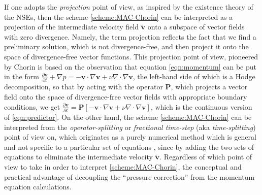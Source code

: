 \documentclass{article}
\begin{document}
If one adopts the \textit{projection} point of view, as inspired by the existence theory of the NSEs, then the scheme \eqref{scheme:MAC-Chorin} can be interpreted as a projection of the intermediate velocity field $\widetilde{\boldsymbol{v}}$ onto a subspace of vector fields with zero divergence. Namely, the term projection reflects
the fact that we find a preliminary solution, which is not divergence-free, and then project it onto the space of divergence-free vector functions. This projection point of view, pioneered by Chorin \cite{Chorin:1968} is based on the observation that equation \eqref{eqn:momentum} can be put in the form $\frac{\partial \boldsymbol{v}}{\partial t} + \nabla p = - \boldsymbol{v} \cdot \nabla \boldsymbol{v} + \nu \nabla \cdot \nabla \boldsymbol{v}$, the left-hand side of which is a Hodge decomposition, so that by acting with the operator $\boldsymbol{P}$, which projects a vector field onto the space of divergence-free vector fields with appropriate boundary conditions, we get $\frac{\partial \boldsymbol{v}}{\partial t} = \boldsymbol{P}\left[- \boldsymbol{v} \cdot \nabla \boldsymbol{v} + \nu \nabla \cdot \nabla \boldsymbol{v}\right]$, which is the continuous version of \eqref{eqn:predictor}. On the other hand, the scheme \eqref{scheme:MAC-Chorin} can be interpreted from the \textit{operator-splitting} or \textit{fractional time-step} (aka \textit{time-splitting}) point of view on, which originates as a purely numerical method which is general and not specific to a particular set of equations \cite{Yanenko:1971}, since by adding the two sets of equations to eliminate the intermediate velocity $\widetilde{\boldsymbol{v}}$. Regardless of which point of view to take in order to interpret \eqref{scheme:MAC-Chorin}, the conceptual and practical advantage of decoupling the ``pressure correction'' from the momentum equation calculations.
\end{document}
